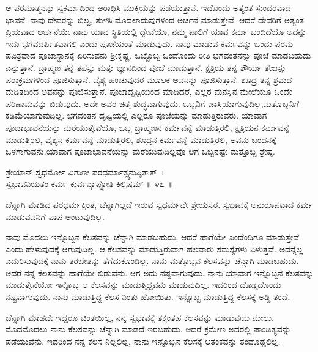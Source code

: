 ಆ ಪರಮಾತ್ಮನನ್ನು ಸ್ವಕರ್ಮದಿಂದ ಆರಾಧಿಸಿ ಮುಕ್ತಿಯನ್ನು ಪಡೆಯುತ್ತಾನೆ. ಇದೊಂದು ಅತ್ಯಂತ ಸುಂದರವಾದ ಭಾವನೆ. ನಾವು ದೇವರನ್ನು ಬಿಲ್ವ, ತುಳಸಿ ಮೊದಲಾದುವುಗಳಿಂದ ಅರ್ಚನೆ ಮಾಡುತ್ತೇವೆ. ಆದರೆ ದೇವರಿಗೆ ಅತ್ಯಂತ ಪ್ರಿಯವಾದ ಅರ್ಚನೆಯೇ ನಾವು ಯಾವ ಸ್ಥಿತಿಯಲ್ಲಿ ದ್ದೇವೆಯೊ, ನಮ್ಮ ಪಾಲಿಗೆ ಯಾವ ಕರ್ಮ ಬಂದಿದೆಯೊ ಅದನ್ನು ಇದು ಭಗವದರ್ಪಿತ\-ವಾಗಲಿ ಎಂದು ಪೂಜೆಯಂತೆ ಮಾಡುವುದು. ನಾವು ಮಾಡುವ ಕರ್ಮವನ್ನು ಒಂದು ಪರಮ ಪವಿತ್ರವಾದ ಪೂಜಾಸ್ಥಾನಕ್ಕೆ ಏರಿಸುವನು ಶ‍್ರೀಕೃಷ್ಣ. ಒಬ್ಬೊಬ್ಬ ಒಂದೊಂದು ರೀತಿ ಭಗವಂತನನ್ನು ಪೂಜೆ ಮಾಡಬಹುದು ಎನ್ನುತ್ತಾನೆ. ಬ್ರಾಹ್ಮಣ ತನ್ನ ತಪಸ್ಸು ಮತ್ತು ಜ್ಞಾನದಿಂದ ಪೂಜೆ ಮಾಡುತ್ತಾನೆ. ಕ್ಷತ್ರಿಯ ತನ್ನ ಶೌರ್ಯ ತೇಜಸ್ಸು ಪರಾಕ್ರಮಗಳಿಂದ ಪೂಜಿಸುತ್ತಾನೆ. ವೈಶ್ಯ ಹಂಚುವುದರ ಮೂಲಕ ಅವನನ್ನು ಪೂಜಿಸುತ್ತಾನೆ. ಶೂದ್ರ ತನ್ನ ಶ್ರಮದ ದುಡಿತದಿಂದ ಅವನನ್ನು ಪೂಜಿಸುತ್ತಾನೆ. ಪೂಜಾದೃಷ್ಟಿಯಿಂದ ಮಾಡಿದರೆ, ಎಲ್ಲರ ಮನಸ್ಸಿನ ಮೇಲೆಯೂ ಒಂದೇ ಪರಿಣಾಮವನ್ನು ಬಿಡುವುದು. ಅದೇ ಅವರ ಚಿತ್ತ ಶುದ್ಧವಾಗುವುದು. ಒಬ್ಬನಿಗೆ ಜಾಸ್ತಿಯಾಗು\-ವುದಿಲ್ಲ,ಮತ್ತೊಬ್ಬನಿಗೆ ಕಡಿಮೆಯಾಗುವುದಿಲ್ಲ. ಭಗವಂತನ ದೃಷ್ಟಿಯಲ್ಲಿ ಎಲ್ಲರೂ ಪೂಜೆಯನ್ನು ಮಾಡುತ್ತಿರುವರು. ಯಾವಾಗ ಪೂಜಾಭಾವನೆಯನ್ನು ಮರೆಯುತ್ತೇವೆಯೊ, ಒಬ್ಬ ಬ್ರಾಹ್ಮಣನ ಕರ್ಮವನ್ನೆ ಮಾಡುತ್ತಿರಲಿ, ಕ್ಷತ್ರಿಯನ ಕರ್ಮವನ್ನೆ ಮಾಡುತ್ತಿರಲಿ, ವೈಶ್ಯನ ಕರ್ಮವನ್ನೆ ಮಾಡುತ್ತಿರಲಿ, ಶೂದ್ರನ ಕರ್ಮವನ್ನೆ ಮಾಡುತ್ತಿರಲಿ, ಅವನು ಬಂಧನಕ್ಕೆ ಒಳಗಾಗುವನು.\break ಯಾವಾಗ ಪೂಜಾಭಾವನೆಯನ್ನು ಮರೆಯುವುದಿಲ್ಲವೊ ಆಗ ಒಬ್ಬನಷ್ಟೇ ಮತ್ತೊಬ್ಬ ಶ್ರೇಷ್ಠ.

\begin{shloka}
ಶ್ರೇಯಾನ್ ಸ್ವಧರ್ಮೋ ವಿಗುಣಃ ಪರಧರ್ಮಾತ್ಸ್ವನುಷ್ಠಿತಾತ್~।\\ಸ್ವಭಾವನಿಯತಂ ಕರ್ಮ ಕುರ್ವನ್ನಾಪ್ನೋತಿ ಕಿಲ್ಬಿಷಮ್ \hfill॥ ೪೭~॥
\end{shloka}

\begin{artha}
ಚೆನ್ನಾಗಿ ಮಾಡಿದ ಪರಧರ್ಮಕ್ಕಿಂತ, ಚೆನ್ನಾಗಿಲ್ಲದೆ ಇರುವ ಸ್ವಧರ್ಮವೇ ಶ್ರೇಯಸ್ಕರ. ಸ್ವಭಾವಕ್ಕೆ ಅನುರೂಪವಾದ ಕರ್ಮ ಮಾಡುವವನಿಗೆ ಪಾಪ ಅಂಟುವುದಿಲ್ಲ.
\end{artha}

ನಾವು ಮೊದಲು ಇನ್ನೊಬ್ಬನ ಕೆಲಸವನ್ನು ಚೆನ್ನಾಗಿ ಮಾಡಬಹುದು. ಆದರೆ ಹಾಗೆಯೇ ಎಂದೆಂದಿಗೂ ಮಾಡುತ್ತೇವೆ ಎಂದು ಹೇಳುವುದಕ್ಕೆ ಆಗುವುದಿಲ್ಲ. ಆ ಕೆಲಸವನ್ನು ಮಾಡುತ್ತಿರುವಾಗ ಹಲವಾರು ಸಮಸ್ಯೆಗಳು ಏಳುತ್ತವೆ. ಅದನ್ನೆಲ್ಲ ಎದುರಿಸುವುದಕ್ಕೆ ನಾನು ತರಬೇತನ್ನು ತೆಗೆದುಕೊಂಡಿಲ್ಲ. ನಾನು ಮತ್ತೊಬ್ಬನ ಕೆಲಸವನ್ನು ಚೆನ್ನಾಗಿ ಮಾಡಬಹುದು. ಆದರೆ ನನ್ನ ಕೆಲಸವನ್ನು ಹಾಗೆಯೇ ಬಿಡುವೆನು. ಆಗ ಅದು ನಷ್ಟವಾಗುವುದು. ನಾನು ಯಾವಾಗ ಇನ್ನೊಬ್ಬನ ಕೆಲಸವನ್ನು ಮಾಡುತ್ತೇನೆಯೋ ಇನ್ನೊಬ್ಬ ಆ ಕೆಲಸವನ್ನು ಮಾಡುತ್ತಿದ್ದವನು ಮಾಡುವುದಿಲ್ಲ. ಇದರಿಂದ ದೊಡ್ಡದೊಂದು ನಷ್ಟವಾಗುವುದು. ನಾನು ಮಾಡುತ್ತಿದ್ದ ಕೆಲಸ ನಿಂತು ಹೋಯಿತು. ಇನ್ನೊಬ್ಬ ಮಾಡುತ್ತಿದ್ದ ಕೆಲಸಕ್ಕೆ ಅಡ್ಡಿ ತಂದೆ.

ಚೆನ್ನಾಗಿ ಮಾಡದೇ ಇದ್ದರೂ ಚಿಂತೆಯಿಲ್ಲ, ನನ್ನ ಸ್ವಭಾವಕ್ಕೆ ತಕ್ಕಂತಹ ಕೆಲಸವನ್ನು ಮಾಡುವುದು ಮೇಲು. ಮೊದಮೊದಲು ನಾನು ಕೆಲಸವನ್ನು ಚೆನ್ನಾಗಿ ಮಾಡದೆ ಇರಬಹುದು. ಆದರೆ ಕ್ರಮೇಣ ಅದರಲ್ಲಿ ಪಾಂಡಿತ್ಯವನ್ನು ಪಡೆಯುವೆನು. ಇದರಿಂದ ನನ್ನ ಕೆಲಸ ನಿಲ್ಲಲಿಲ್ಲ, ನಾನು ಇನ್ನೊಬ್ಬನ ಕೆಲಸಕ್ಕೆ ಆತಂಕವನ್ನು ತಂದೊಡ್ಡಲಿಲ್ಲ.

